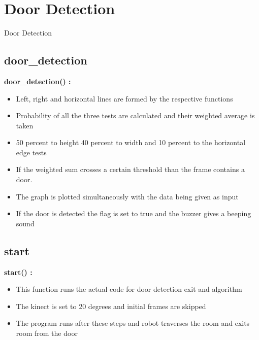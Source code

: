 \documentclass[10pt, a4paper]{beamer}
\begin{document}
\section{Door Detection}
\begin{frame}[allowframebreaks]{Door Detection}
  \subsection{door\_detection}
    \textbf{door\_detection() : }
      \begin{itemize}
       \item Left, right and horizontal lines are formed by the respective functions
       \item Probability of all the three tests are calculated and their weighted average is taken
       \item 50 percent to height 40 percent to width and 10 percent to the horizontal edge tests
       \item If the weighted sum crosses a certain threshold than the frame contains a door.
       \item The graph is plotted simultaneously with the data being given as input
       \item If the door is detected the flag is set to true and the buzzer gives a beeping sound
      \end{itemize}
\framebreak
  \subsection{start}
    \textbf{start() : }
      \begin{itemize}
       \item This function runs the actual code for door detection exit and algorithm
       \item The kinect is set to 20 degrees and initial frames are skipped
       \item The program runs after these steps and robot traverses the room and exits room from the door
      \end{itemize}
\end{frame}
\end{document}
